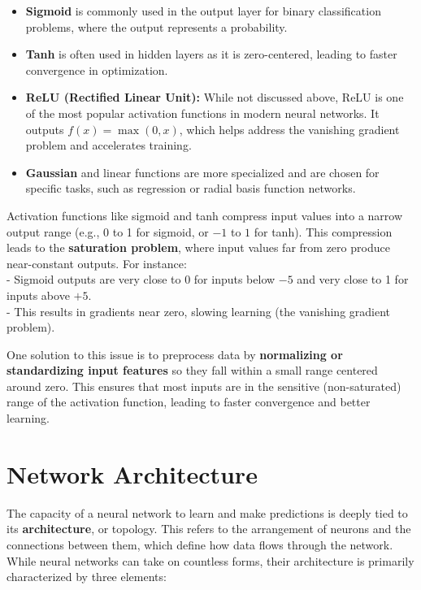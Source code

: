 \documentclass[
]{book}
\providecommand{\tightlist}{%
  \setlength{\itemsep}{0pt}\setlength{\parskip}{0pt}}
\theoremstyle{definition}
\theoremstyle{definition}
\theoremstyle{definition}
\theoremstyle{definition}
\theoremstyle{remark}
\begin{document}
\begin{itemize}
\tightlist
\item
  \textbf{Sigmoid} is commonly used in the output layer for binary classification problems, where the output represents a probability.\\
\item
  \textbf{Tanh} is often used in hidden layers as it is zero-centered, leading to faster convergence in optimization.\\
\item
  \textbf{ReLU (Rectified Linear Unit):} While not discussed above, ReLU is one of the most popular activation functions in modern neural networks. It outputs \(f(x) = \max(0, x)\), which helps address the vanishing gradient problem and accelerates training.\\
\item
  \textbf{Gaussian} and linear functions are more specialized and are chosen for specific tasks, such as regression or radial basis function networks.
\end{itemize}

Activation functions like sigmoid and tanh compress input values into a narrow output range (e.g., 0 to 1 for sigmoid, or \(-1\) to \(1\) for tanh). This compression leads to the \textbf{saturation problem}, where input values far from zero produce near-constant outputs. For instance:\\
- Sigmoid outputs are very close to 0 for inputs below \(-5\) and very close to 1 for inputs above \(+5\).\\
- This results in gradients near zero, slowing learning (the vanishing gradient problem).

One solution to this issue is to preprocess data by \textbf{normalizing or standardizing input features} so they fall within a small range centered around zero. This ensures that most inputs are in the sensitive (non-saturated) range of the activation function, leading to faster convergence and better learning.

\section{Network Architecture}\label{network-architecture}

The capacity of a neural network to learn and make predictions is deeply tied to its \textbf{architecture}, or topology. This refers to the arrangement of neurons and the connections between them, which define how data flows through the network. While neural networks can take on countless forms, their architecture is primarily characterized by three elements:
\end{document}
